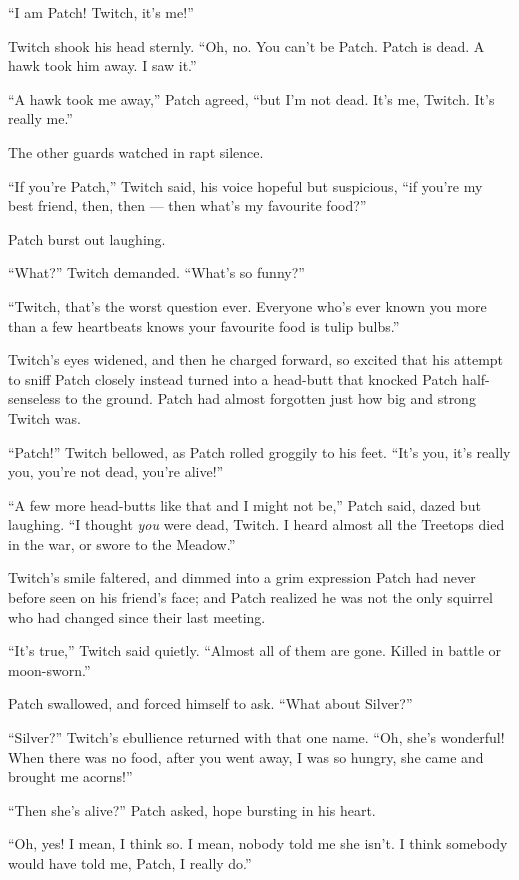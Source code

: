 \documentclass[ebook,oneside,openany,12pt]{memoir}
\begin{document}
“I am Patch! Twitch, it’s me!”

Twitch shook his head sternly. “Oh, no. You can’t be Patch. Patch is
dead. A hawk took him away. I saw it.”

“A hawk took me away,” Patch agreed, “but I’m not dead. It’s me,
Twitch. It’s really me.”

The other guards watched in rapt silence.

“If you’re Patch,” Twitch said, his voice hopeful but suspicious, “if
you’re my best friend, then, then — then what’s my favourite food?”

Patch burst out laughing.

“What?” Twitch demanded. “What’s so funny?”

“Twitch, that’s the worst question ever. Everyone who’s ever known you
more than a few heartbeats knows your favourite food is tulip bulbs.”

Twitch’s eyes widened, and then he charged forward, so excited that
his attempt to sniff Patch closely instead turned into a head-butt
that knocked Patch half-senseless to the ground. Patch had almost
forgotten just how big and strong Twitch was.

“Patch!” Twitch bellowed, as Patch rolled groggily to his feet. “It’s
you, it’s really you, you’re not dead, you’re alive!”

“A few more head-butts like that and I might not be,” Patch said,
dazed but laughing. “I thought \emph{you} were dead, Twitch. I heard
almost all the Treetops died in the war, or swore to the Meadow.”

Twitch’s smile faltered, and dimmed into a grim expression Patch had
never before seen on his friend’s face; and Patch realized he was not
the only squirrel who had changed since their last meeting.

“It’s true,” Twitch said quietly. “Almost all of them are gone. Killed
in battle or moon-sworn.”

Patch swallowed, and forced himself to ask. “What about Silver?”

“Silver?” Twitch’s ebullience returned with that one name. “Oh, she’s
wonderful! When there was no food, after you went away, I was so
hungry, she came and brought me acorns!”

“Then she’s alive?” Patch asked, hope bursting in his heart.

“Oh, yes! I mean, I think so. I mean, nobody told me she isn’t. I
think somebody would have told me, Patch, I really do.”
\end{document}
